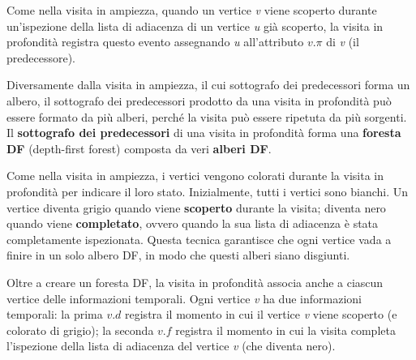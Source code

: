 \documentclass[10pt, a4paper]{report}
\begin{document}
Come nella visita in ampiezza, quando un vertice \textit{v} viene scoperto durante un'ispezione della lista di adiacenza di un vertice \textit{u} già scoperto, la visita in profondità registra questo evento assegnando \textit{u} all'attributo $v.\pi$ di \textit{v} (il predecessore).

Diversamente dalla visita in ampiezza, il cui sottografo dei predecessori forma un albero, il sottografo dei predecessori prodotto da una visita in profondità può essere formato da più alberi, perché la visita può essere ripetuta da più sorgenti. Il \textbf{sottografo dei predecessori} di una visita in profondità forma una \textbf{foresta DF} (depth-first forest) composta da veri \textbf{alberi DF}.

Come nella visita in ampiezza, i vertici vengono colorati durante la visita in profondità per indicare il loro stato. Inizialmente, tutti i vertici sono bianchi. Un vertice diventa grigio quando viene \textbf{scoperto} durante la visita; diventa nero quando viene \textbf{completato}, ovvero quando la sua lista di adiacenza è stata completamente ispezionata. Questa tecnica garantisce che ogni vertice vada a finire in un solo albero DF, in modo che questi alberi siano disgiunti.

Oltre a creare un foresta DF, la visita in profondità associa anche a ciascun vertice delle informazioni temporali. Ogni vertice \textit{v} ha due informazioni temporali: la prima $v.d$ registra il momento in cui il vertice \textit{v} viene scoperto (e colorato di grigio); la seconda $v.f$ registra il momento in cui la visita completa l'ispezione della lista di adiacenza del vertice \textit{v} (che diventa nero).
\end{document}
